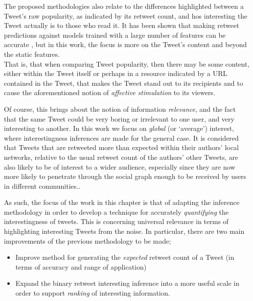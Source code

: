 The proposed methodologies also relate to the differences highlighted between a Tweet's raw popularity, as indicated by its retweet count, and hos interesting the Tweet actually is to those who read it. It has been shown that making retweet predictions against models trained with a large number of features can be accurate \cite{zhu11}, but in this work, the focus is more on the Tweet's content and beyond the static features.\\
That is, that when comparing Tweet popularity, then there may be some content, either within the Tweet itself or perhaps in a resource indicated by a URL contained in the Tweet, that makes the Tweet stand out to its recipients and to cause the aforementioned notion of \textit{affective stimulation} \cite{xu07} to its viewers.

Of course, this brings about the notion of information \textit{relevance}, and the fact that the same Tweet could be very boring or irrelevant to one user, and very interesting to another. In this work we focus on \textit{global} (or `average') interest, where interestingness inferences are made for the general case. It is considered that Tweets that are retweeted more than expected within their authors' local networks, relative to the usual retweet count of the authors' other Tweets, are also likely to be of interest to a wider audience, especially since they are now more likely to penetrate through the social graph enough to be received by users in different communities..
 
As such, the focus of the work in this chapter is that of adapting the inference methodology in order to develop a technique for accurately \textit{quantifying} the interestingness of tweets. This is concerning universal relevance in terms of highlighting interesting Tweets from the noise. In particular, there are two main improvements of the previous methodology to be made;
\begin{itemize}
    \item Improve method for generating the \textit{expected} retweet count of a Tweet (in terms of accuracy and range of application)
    \item Expand the binary retweet interesting inference into a more useful scale in order to support \textit{ranking} of interesting information.
\end{itemize}


